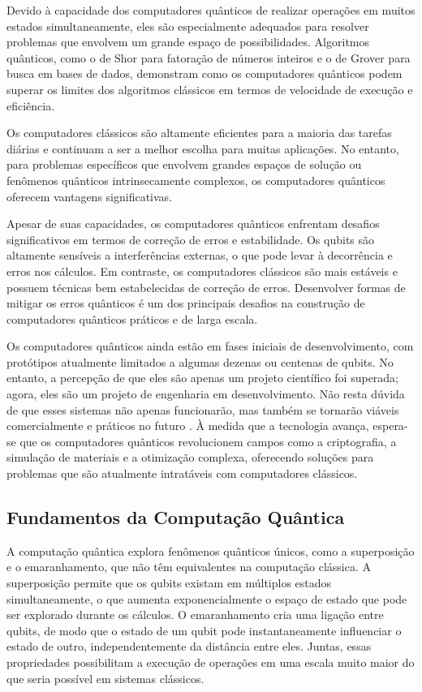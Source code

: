 Devido à capacidade dos computadores quânticos de realizar operações em muitos estados simultaneamente, eles são especialmente adequados para resolver problemas que envolvem um grande espaço de possibilidades. Algoritmos quânticos, como o de Shor para fatoração de números inteiros e o de Grover para busca em bases de dados, demonstram como os computadores quânticos podem superar os limites dos algoritmos clássicos em termos de velocidade de execução e eficiência.

Os computadores clássicos são altamente eficientes para a maioria das tarefas diárias e continuam a ser a melhor escolha para muitas aplicações. No entanto, para problemas específicos que envolvem grandes espaços de solução ou fenômenos quânticos intrinsecamente complexos, os computadores quânticos oferecem vantagens significativas.

Apesar de suas capacidades, os computadores quânticos enfrentam desafios significativos em termos de correção de erros e estabilidade. Os qubits são altamente sensíveis a interferências externas, o que pode levar à decorrência e erros nos cálculos. Em contraste, os computadores clássicos são mais estáveis e possuem técnicas bem estabelecidas de correção de erros. Desenvolver formas de mitigar os erros quânticos é um dos principais desafios na construção de computadores quânticos práticos e de larga escala.

Os computadores quânticos ainda estão em fases iniciais de desenvolvimento, com protótipos atualmente limitados a algumas dezenas ou centenas de qubits. No entanto, a percepção de que eles são apenas um projeto científico foi superada; agora, eles são um projeto de engenharia em desenvolvimento. Não resta dúvida de que esses sistemas não apenas funcionarão, mas também se tornarão viáveis comercialmente e práticos no futuro \cite{Callan2024}. À medida que a tecnologia avança, espera-se que os computadores quânticos revolucionem campos como a criptografia, a simulação de materiais e a otimização complexa, oferecendo soluções para problemas que são atualmente intratáveis com computadores clássicos.

\subsection{Fundamentos da Computação Quântica}

A computação quântica explora fenômenos quânticos únicos, como a superposição e o emaranhamento, que não têm equivalentes na computação clássica. A superposição permite que os qubits existam em múltiplos estados simultaneamente, o que aumenta exponencialmente o espaço de estado que pode ser explorado durante os cálculos. O emaranhamento cria uma ligação entre qubits, de modo que o estado de um qubit pode instantaneamente influenciar o estado de outro, independentemente da distância entre eles. Juntas, essas propriedades possibilitam a execução de operações em uma escala muito maior do que seria possível em sistemas clássicos.

